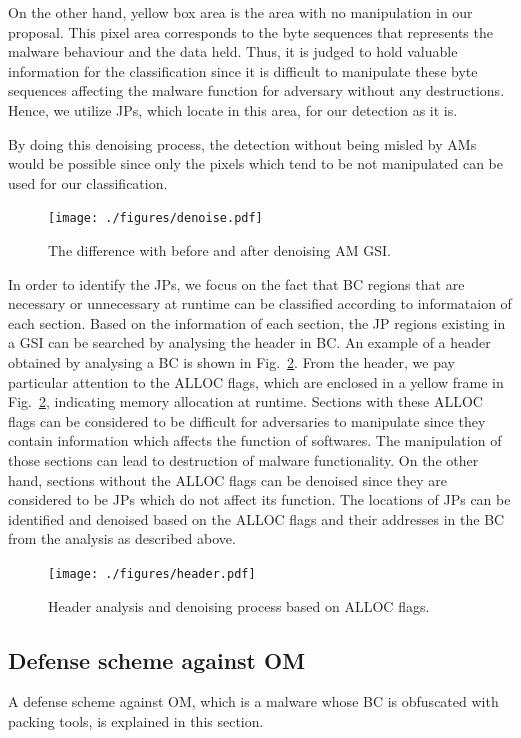 \documentclass{ieeeaccess}
\newcommand{\myfigurename}{Fig.}
\begin{document}
On the other hand, yellow box area is the area with no manipulation in our proposal.
This pixel area corresponds to the byte sequences that represents the malware behaviour and the data held.
Thus, it is judged to hold valuable information for the classification since it is difficult to manipulate these byte sequences affecting the malware function for adversary without any destructions.
Hence, we utilize JPs, which locate in this area, for our detection as it is.

By doing this denoising process, the detection without being misled by AMs would be possible since only the pixels which tend to be not manipulated can be used for our classification.

\begin{figure}[t]
 \centering
 \texttt{[image: ./figures/denoise.pdf]}
 \caption{The difference with before and after denoising AM GSI.} 
 \label{fig:denoise}
\end{figure}

In order to identify the JPs, we focus on the fact that BC regions that are necessary or unnecessary at runtime can be classified according to informataion of each section.
Based on the information of each section, the JP regions existing in a GSI can be searched by analysing the header in BC.
An example of a header obtained by analysing a BC is shown in \myfigurename~\ref{fig:header}.
From the header, we pay particular attention to the ALLOC flags, which are enclosed in a yellow frame in \myfigurename~\ref{fig:header}, indicating memory allocation at runtime.
Sections with these ALLOC flags can be considered to be difficult for adversaries to manipulate since they contain information which affects the function of softwares.
The manipulation of those sections can lead to destruction of malware functionality. 
On the other hand, sections without the ALLOC flags can be denoised since they are considered to be JPs which do not affect its function.
The locations of JPs can be identified and denoised based on the ALLOC flags and their addresses in the BC from the analysis as described above.
\begin{figure}[t]
 \centering
 \texttt{[image: ./figures/header.pdf]}
	\caption{Header analysis and denoising process based on ALLOC flags.} 
 \label{fig:header}
\end{figure}

\subsection{Defense scheme against OM}
A defense scheme against OM, which is a malware whose BC is obfuscated with packing tools, is explained in this section.
\end{document}
